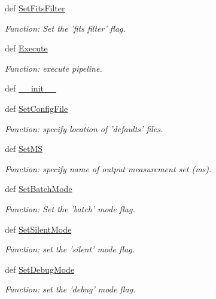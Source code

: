 \begin{DoxyCompactItemize}
def \hyperlink{class_pipeline-0_1_1_pipeline_aab84cef635f2b9ba7ce69d5713e6ce6f}{\-Set\-Fits\-Filter}
\begin{DoxyCompactList}\small\item\em \-Function\-: \-Set the 'fits filter' flag. \end{DoxyCompactList}\item 
def \hyperlink{class_pipeline-0_1_1_pipeline_ad43349c5927428783f0ace239f066830}{\-Execute}
\begin{DoxyCompactList}\small\item\em \-Function\-: execute pipeline. \end{DoxyCompactList}\item 
def \hyperlink{class_pipeline-0_1_1_pipeline_a5447de828ea69f6a94c785f4a3a0287f}{\-\_\-\-\_\-init\-\_\-\-\_\-}
\item 
def \hyperlink{class_pipeline-0_1_1_pipeline_a86d71d9abde9c0d192a56ad1642a9881}{\-Set\-Config\-File}
\begin{DoxyCompactList}\small\item\em \-Function\-: specify location of 'defaults' files. \end{DoxyCompactList}\item 
def \hyperlink{class_pipeline-0_1_1_pipeline_afe70379ec45cebe981d2ebab7d988729}{\-Set\-M\-S}
\begin{DoxyCompactList}\small\item\em \-Function\-: specify name of output measurement set (ms). \end{DoxyCompactList}\item 
def \hyperlink{class_pipeline-0_1_1_pipeline_a4d55d3e62c94a121a6472b38e2772d2b}{\-Set\-Batch\-Mode}
\begin{DoxyCompactList}\small\item\em \-Function\-: \-Set the 'batch' mode flag. \end{DoxyCompactList}\item 
def \hyperlink{class_pipeline-0_1_1_pipeline_a9c1c6502545b1d3531ec7d291cb18586}{\-Set\-Silent\-Mode}
\begin{DoxyCompactList}\small\item\em \-Function\-: set the 'silent' mode flag. \end{DoxyCompactList}\item 
def \hyperlink{class_pipeline-0_1_1_pipeline_ac8f6ada88a526bc7b060e1163748c94d}{\-Set\-Debug\-Mode}
\begin{DoxyCompactList}\small\item\em \-Function\-: set the 'debug' mode flag. \end{DoxyCompactList}\item 

\end{DoxyCompactItemize}
